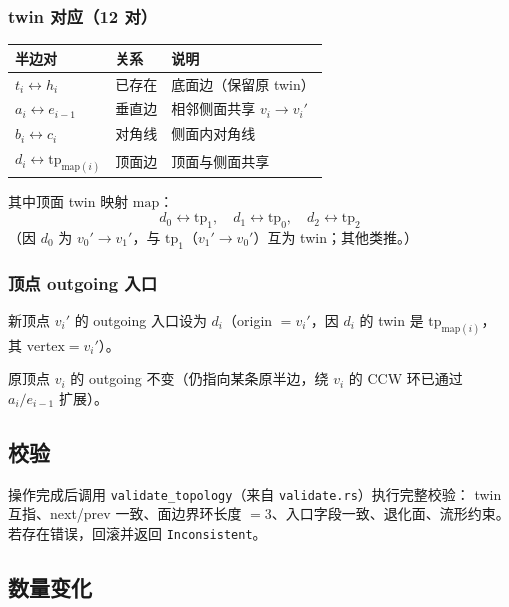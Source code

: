 \documentclass[11pt,a4paper]{article}
\begin{document}
\subsubsection{twin 对应（12 对）}

\begin{center}
\renewcommand{\arraystretch}{1.18}
\begin{tabular}{@{}lll@{}}
  \toprule
  \textbf{半边对} & \textbf{关系} & \textbf{说明} \\
  \midrule
  $t_i \leftrightarrow h_i$ & 已存在 & 底面边（保留原 twin） \\
  $a_i \leftrightarrow e_{i-1}$ & 垂直边 & 相邻侧面共享 $v_i \to v_i'$ \\
  $b_i \leftrightarrow c_i$ & 对角线 & 侧面内对角线 \\
  $d_i \leftrightarrow \mathrm{tp}_{\mathrm{map}(i)}$ & 顶面边 & 顶面与侧面共享 \\
  \bottomrule
\end{tabular}
\end{center}

其中顶面 twin 映射 $\mathrm{map}$：
\[
  d_0 \leftrightarrow \mathrm{tp}_1,\quad
  d_1 \leftrightarrow \mathrm{tp}_0,\quad
  d_2 \leftrightarrow \mathrm{tp}_2
\]
（因 $d_0$ 为 $v_0' \to v_1'$，与 $\mathrm{tp}_1$（$v_1' \to v_0'$）互为 twin；其他类推。）

\subsubsection{顶点 outgoing 入口}

新顶点 $v_i'$ 的 outgoing 入口设为 $d_i$（origin $= v_i'$，因 $d_i$ 的 twin 是 $\mathrm{tp}_{\mathrm{map}(i)}$，
其 $\mathrm{vertex} = v_i'$）。

原顶点 $v_i$ 的 outgoing 不变（仍指向某条原半边，绕 $v_i$ 的 CCW 环已通过 $a_i/e_{i-1}$ 扩展）。

\subsection{校验}

操作完成后调用 \texttt{validate\_topology}（来自 \texttt{validate.rs}）执行完整校验：
twin 互指、next/prev 一致、面边界环长度 $= 3$、入口字段一致、退化面、流形约束。
若存在错误，回滚并返回 \texttt{Inconsistent}。

\subsection{数量变化}
\end{document}
